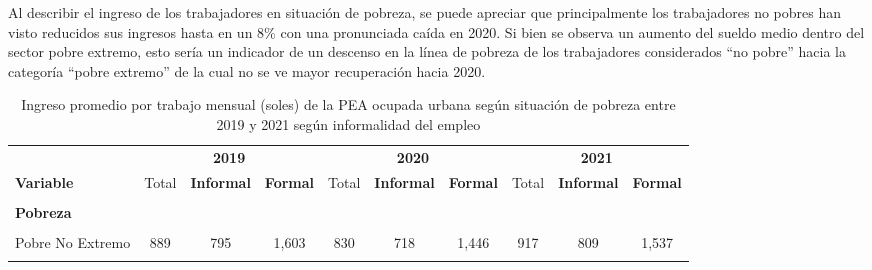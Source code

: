 \documentclass[
  letterpaper,
  12pt,
  oneside,
  spanish,
  doublespacing,
  headsepline,
  parskip]{MastersDoctoralThesis}
\begin{document}
Al describir el ingreso de los trabajadores en situación de pobreza, se
puede apreciar que principalmente los trabajadores no pobres han visto
reducidos sus ingresos hasta en un 8\% con una pronunciada caída en
2020. Si bien se observa un aumento del sueldo medio dentro del sector
pobre extremo, esto sería un indicador de un descenso en la línea de
pobreza de los trabajadores considerados ``no pobre'' hacia la categoría
``pobre extremo'' de la cual no se ve mayor recuperación hacia 2020.

\hypertarget{tbl-ing_pobreza}{}
\begin{table}[H]
\caption{\label{tbl-ing_pobreza}Ingreso promedio por trabajo mensual (soles) de la PEA ocupada urbana
según situación de pobreza entre 2019 y 2021 según informalidad del
empleo }\tabularnewline

\centering\begingroup\fontsize{9}{11}\selectfont

\begin{tabular}{lccccccccc}
\toprule
\multicolumn{1}{c}{ } & \multicolumn{3}{c}{\textbf{2019}} & \multicolumn{3}{c}{\textbf{2020}} & \multicolumn{3}{c}{\textbf{2021}} \\
\cmidrule(l{3pt}r{3pt}){2-4} \cmidrule(l{3pt}r{3pt}){5-7} \cmidrule(l{3pt}r{3pt}){8-10}
\textbf{Variable} & Total & \textbf{Informal} & \textbf{Formal} & Total & \textbf{Informal} & \textbf{Formal} & Total & \textbf{Informal} & \textbf{Formal}\\
\midrule
\cellcolor{gray!6}{\textbf{Nacional}} & \cellcolor{gray!6}{1,595} & \cellcolor{gray!6}{1,037} & \cellcolor{gray!6}{2,599} & \cellcolor{gray!6}{1,407} & \cellcolor{gray!6}{901} & \cellcolor{gray!6}{2,380} & \cellcolor{gray!6}{1,443} & \cellcolor{gray!6}{989} & \cellcolor{gray!6}{2,473}\\
\textbf{Pobreza} &  &  &  &  &  &  &  &  & \\
\cellcolor{gray!6}{Pobre Extremo} & \cellcolor{gray!6}{555} & \cellcolor{gray!6}{551} & \cellcolor{gray!6}{815} & \cellcolor{gray!6}{550} & \cellcolor{gray!6}{526} & \cellcolor{gray!6}{864} & \cellcolor{gray!6}{682} & \cellcolor{gray!6}{646} & \cellcolor{gray!6}{1,168}\\
Pobre No Extremo & 889 & 795 & 1,603 & 830 & 718 & 1,446 & 917 & 809 & 1,537\\
\cellcolor{gray!6}{No Pobre} & \cellcolor{gray!6}{1,686} & \cellcolor{gray!6}{1,084} & \cellcolor{gray!6}{2,634} & \cellcolor{gray!6}{1,545} & \cellcolor{gray!6}{965} & \cellcolor{gray!6}{2,464} & \cellcolor{gray!6}{1,556} & \cellcolor{gray!6}{1,041} & \cellcolor{gray!6}{2,555}\\
\bottomrule
\end{tabular}
\endgroup{}
\end{table}
\end{document}
